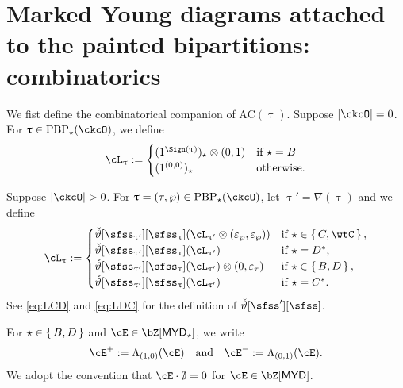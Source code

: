 \documentclass[12pt,a4paper]{amsart}
\newcommand{\AC}{\mathrm{AC}}
\def\abs#1{\left|{#1}\right|}
\def\MYD{{\mathsf{MYD}}}
\def\AND{\quad\text{and}\quad}
\def\AC{\mathrm{AC}}
\def\DD{\nabla}
\numberwithin{equation}{section}
\theoremstyle{remark}
\def\uptaup{\uptau^{\prime}}
\def\PBP{\mathrm{PBP}}
\begin{document}
\section{Marked Young diagrams attached to the painted bipartitions: combinatorics} \label{sec:ACC}

We fist define the combinatorical companion of $\AC(\uptau)$.
Suppose $\abs{\ckcO}=0$. For $\uptau\in \PBP_{\star}(\ckcO)$, we define
\[
  \ac_{\uptau} :=
  \begin{cases}
   (1^{\Sign(\uptau)})_{\star}\lotimes(0,1) & \text{if } \star=B\\
   (1^{(0,0)})_{\star} & \text{otherwise}.
  \end{cases}
\]

Suppose $\abs{\ckcO} >0$. For $\uptau = (\tau,\wp)\in \PBP_{\star}(\ckcO)$, let
$\uptau' = \DD(\uptau)$ and we define
\[
\ac_{\uptau} :=
\begin{cases}
  \dlift[\sfss_{\uptau'}][\sfss_{\uptau}](\ac_{\uptaup}\lotimes (\varepsilon_{\wp},\varepsilon_{\wp}))
  & \text{if } \star\in \set{C,\wtC},\\
  \dlift[\sfss_{\uptau'}][\sfss_{\uptau}](\ac_{\uptaup})
  & \text{if } \star = D^{*}, \\
  \dlift[\sfss_{\uptau'}][\sfss_{\uptau}](\ac_{\uptaup})\lotimes (0,\varepsilon_{\tau})
  & \text{if } \star \in \set{B,D}, \\
  \dlift[\sfss_{\uptau'}][\sfss_{\uptau}](\ac_{\uptaup})
  & \text{if } \star = C^{*}.
\end{cases}
\]
See  \eqref{eq:LCD} and \eqref{eq:LDC} for the definition of $\dlift[\sfss'][\sfss]$.

For $\star\in \set{B,D}$ and $\cE\in \bZ[\MYD_{\star}]$, we write
\[
\cE^{+} := \Lambda_{(1,0)}(\cE) \AND \cE^{-} := \Lambda_{(0,1)}(\cE).
\]
We adopt the convention that $\cE\cdot \emptyset = 0$ for $\cE\in\bZ[\MYD]$.
\end{document}
